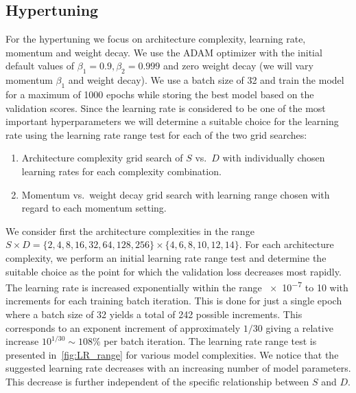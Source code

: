 \subsection{Hypertuning}
For the hypertuning we focus on architecture complexity, learning rate, momentum and weight decay. We use the ADAM optimizer with the initial default values of $\beta_1 = 0.9, \beta_2 = 0.999$ and zero weight decay (we will vary momentum $\beta_1$ and weight decay). We use a batch size of 32 and train the model for a maximum of 1000 epochs while storing the best model based on the validation scores.
Since the learning rate is considered to be one of the most important hyperparameters we will determine a suitable choice for the learning rate using the learning rate range test for each of the two grid searches:
\begin{enumerate}
  \item Architecture complexity grid search of $S$ vs.\ $D$ with individually chosen learning rates for each complexity combination.
  \item Momentum vs.\ weight decay grid search with learning range chosen with regard to each momentum setting.
\end{enumerate}
We consider first the architecture complexities in the range $S \times D =
\{2,4,8,16,32,64,128,256\} \times \{4,6,8,10,12,14\}$. For each architecture
complexity, we perform an initial learning rate range test and determine the suitable choice as the point for which the validation loss decreases most rapidly. The learning rate is increased exponentially within the range \num{e-7} to 10 with increments for each training batch iteration. This is done for just a single epoch where a batch size of 32 yields a total of 242 possible increments. This corresponds to an exponent increment of approximately $1/30$ giving a relative increase $10^{1/30} \sim 108\%$ per batch iteration. The learning rate range test is presented in~\cref{fig:LR_range} for various model complexities. We notice that the suggested learning rate decreases with an increasing number of model parameters. This decrease is further independent of the specific relationship between $S$ and $D$.

